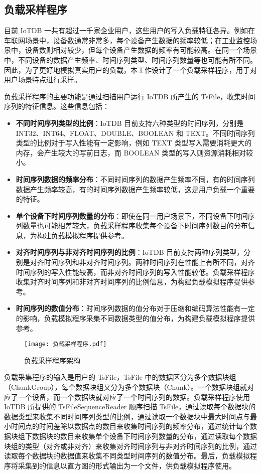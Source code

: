 \subsection{负载采样程序}
目前 IoTDB 一共有超过一千家企业用户，这些用户的写入负载特征各异。例如在车联网场景中，设备数通常非常多，每个设备产生数据的频率较低；在工业监控场景中，设备数则相对较少，但每个设备产生数据的频率有可能较高。在同一个场景中，不同设备的数据产生频率、时间序列类型、时间序列数量等也可能有所不同。因此，为了更好地模拟真实用户的负载，本工作设计了一个负载采样程序，用于对用户场景特点进行采样。

负载采样程序的主要功能是通过扫描用户运行 IoTDB 所产生的 TsFile，收集时间序列的特征信息。这些信息包括：
\begin{itemize}
  \item \textbf{不同时间序列类型的比例}：IoTDB 目前支持六种类型的时间序列，分别是 INT32、INT64、FLOAT、DOUBLE、BOOLEAN 和 TEXT。不同时间序列类型的比例对于写入性能有一定影响，例如 TEXT 类型写入需要消耗更大的内存，会产生较大的写前日志，而 BOOLEAN 类型的写入则资源消耗相对较小。
  \item \textbf{时间序列数据的频率分布}：不同时间序列的数据产生频率不同，有的时间序列数据产生频率较高，有的时间序列数据产生频率较低，这是用户负载一个重要的特征。
  \item \textbf{单个设备下时间序列数量的分布}：即使在同一用户场景下，不同设备下时间序列数量也可能相差较大，负载采样程序收集每个设备下时间序列数目的分布信息，为构建负载模拟程序提供参考。
  \item \textbf{对齐时间序列与非对齐时间序列的比例}：IoTDB 目前支持两种序列类型，分别是对齐时间序列和非对齐时间序列。两种时间序列在性能上有所不同，对齐时间序列的写入性能较高，而非对齐时间序列的写入性能较低。负载采样程序收集对齐时间序列和非对齐时间序列的比例信息，为构建负载模拟程序提供参考。
  \item \textbf{时间序列的数值分布}：时间序列数据的值分布对于压缩和编码算法性能有一定的影响，负载模拟程序采集不同数据类型的值分布，为构建负载模拟程序提供参考。
\end{itemize}

\begin{figure}
  \centering
  \texttt{[image: 负载采样程序.pdf]}
  \caption{负载采样程序架构}
  \label{fig:load-sampling-program}
\end{figure}

负载采集程序的输入是用户的 TsFile，TsFile 中的数据区分为多个数据块组（ChunkGroup），每个数据块组又分为多个数据块（Chunk）。一个数据块组就对应了一个设备，而一个数据块就对应了一个时间序列的数据。负载采样程序使用 IoTDB 所提供的 TsFileSequenceReader 顺序扫描 TsFile，通过读取每个数据块的数据类型来收集不同时间序列类型的比例，通过读取一个数据块中最大时间点与最小时间点的时间差除以数据点的数目来收集时间序列的频率分布，通过统计每个数据块组下数据块的数目来收集单个设备下时间序列数量的分布，通过读取每个数据块组的类型（对齐或非对齐）来收集对齐时间序列与非对齐时间序列的比例，通过读取每个数据块的数据值来收集不同类型时间序列的数值分布。最后，负载模拟程序将采集到的信息以直方图的形式输出为一个文件，供负载模拟程序使用。

